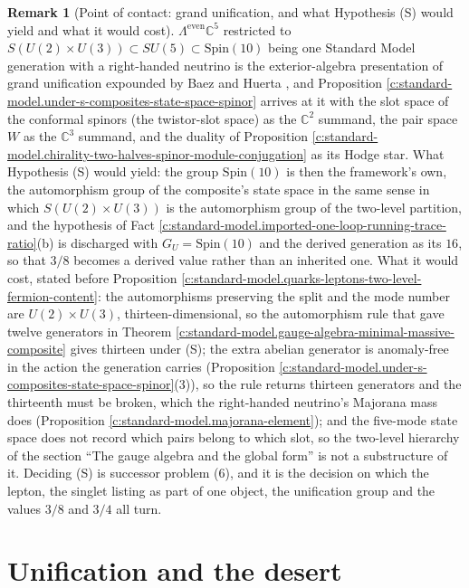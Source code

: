 \documentclass[11pt]{article}
\theoremstyle{definition}
\newtheorem{remark}[theorem]{Remark}
\theoremstyle{plain}
\newcommand{\changedmark}[2]{\marginpar{\raggedright\scriptsize\color{#1}#2}}
\providecommand{\C}{}\renewcommand{\C}{\mathbb{C}}
\begin{document}
\begin{remark}[Point of contact: grand unification, and what Hypothesis (S) would yield and what it would cost]\label{c:note.standard-model.point-contact-grand-unification-what-hypothesis}
\changedmark{gray}{reworded}
$\Lambda^{\mathrm{even}}\C^{5}$ restricted to $S(U(2) \times U(3)) \subset SU(5) \subset \mathrm{Spin}(10)$ being one Standard Model generation with a right-handed neutrino is the exterior-algebra presentation of grand unification expounded by Baez and Huerta \cite{BaezHuerta2010}, and Proposition \ref{c:standard-model.under-s-composites-state-space-spinor} arrives at it with the slot space of the conformal spinors (the twistor-slot space) as the $\C^{2}$ summand, the pair space $W$ as the $\C^{3}$ summand, and the duality of Proposition \ref{c:standard-model.chirality-two-halves-spinor-module-conjugation} as its Hodge star. What Hypothesis (S) would yield: the group $\mathrm{Spin}(10)$ is then the framework's own, the automorphism group of the composite's state space in the same sense in which $S(U(2) \times U(3))$ is the automorphism group of the two-level partition, and the hypothesis of Fact \ref{c:standard-model.imported-one-loop-running-trace-ratio}(b) is discharged with $G_{U} = \mathrm{Spin}(10)$ and the derived generation as its $16$, so that $3/8$ becomes a derived value rather than an inherited one. What it would cost, stated before Proposition \ref{c:standard-model.quarks-leptons-two-level-fermion-content}: the automorphisms preserving the split and the mode number are $U(2) \times U(3)$, thirteen-dimensional, so the automorphism rule that gave twelve generators in Theorem \ref{c:standard-model.gauge-algebra-minimal-massive-composite} gives thirteen under (S); the extra abelian generator is anomaly-free in the action the generation carries (Proposition \ref{c:standard-model.under-s-composites-state-space-spinor}(3)), so the rule returns thirteen generators and the thirteenth must be broken, which the right-handed neutrino's Majorana mass does (Proposition \ref{c:standard-model.majorana-element}); and the five-mode state space does not record which pairs belong to which slot, so the two-level hierarchy of the section ``The gauge algebra and the global form'' is not a substructure of it. Deciding (S) is successor problem (6), and it is the decision on which the lepton, the singlet listing as part of one object, the unification group and the values $3/8$ and $3/4$ all turn.
\end{remark}

\section{Unification and the desert}
\end{document}
